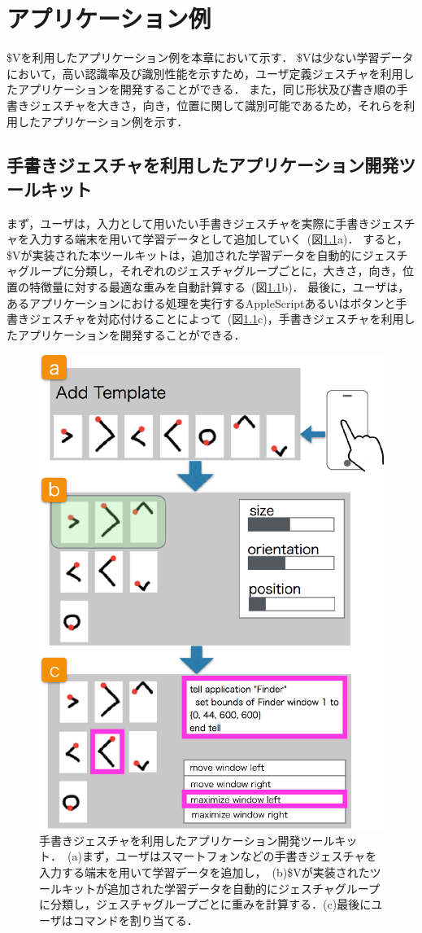 \chapter{アプリケーション例}
\$Vを利用したアプリケーション例を本章において示す．
\$Vは少ない学習データにおいて，高い認識率及び識別性能を示すため，ユーザ定義ジェスチャを利用したアプリケーションを開発することができる．
また，同じ形状及び書き順の手書きジェスチャを大きさ，向き，位置に関して識別可能であるため，それらを利用したアプリケーション例を示す．

\section{手書きジェスチャを利用したアプリケーション開発ツールキット}
まず，ユーザは，入力として用いたい手書きジェスチャを実際に手書きジェスチャを入力する端末を用いて学習データとして追加していく~(図\ref{fig:flow}a)．
すると，\$Vが実装された本ツールキットは，追加された学習データを自動的にジェスチャグループに分類し，それぞれのジェスチャグループごとに，大きさ，向き，位置の特徴量に対する最適な重みを自動計算する~(図\ref{fig:flow}b)．
最後に，ユーザは，あるアプリケーションにおける処理を実行するAppleScriptあるいはボタンと手書きジェスチャを対応付けることによって~(図\ref{fig:flow}c)，手書きジェスチャを利用したアプリケーションを開発することができる．

\begin{figure} [h!]
	\begin{center}
		\includegraphics [width=0.8\hsize ]{img/flow.eps}
	\end{center}
	\caption{手書きジェスチャを利用したアプリケーション開発ツールキット．~(a)まず，ユーザはスマートフォンなどの手書きジェスチャを入力する端末を用いて学習データを追加し，~(b)\$Vが実装されたツールキットが追加された学習データを自動的にジェスチャグループに分類し，ジェスチャグループごとに重みを計算する．(c)最後にユーザはコマンドを割り当てる．}
	\label{fig:flow}
\end{figure}

